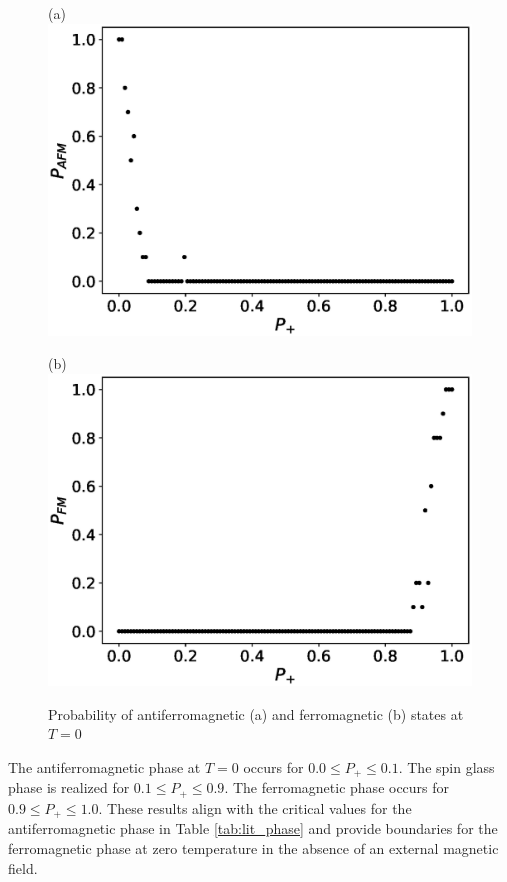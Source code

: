 \documentclass[utf8, babel, sor, jor, amsmath, amssymb, reprint]{elsarticle} %
\begin{document}
\begin{figure}[H]
	\begin{minipage}[h]{0.45\linewidth}
		\centering (a)
		\includegraphics[width=1\linewidth]{images/P_AFM_Mmax.eps}
	\end{minipage}
	\hfill
	\begin{minipage}[h]{0.45\linewidth}
		\centering (b)
		\includegraphics[width=1\linewidth]{images/P_FM_Mmax.eps}
	\end{minipage}
	\caption{Probability of antiferromagnetic (a) and ferromagnetic (b) states at \( T = 0 \)}
	\label{fig:P_AFM_FM_Mmax}
\end{figure}

The antiferromagnetic phase at $T = 0$ occurs for $0.0 \leq P_+ \leq 0.1$. The spin glass phase is realized for $0.1 \leq P_+ \leq 0.9$. The ferromagnetic phase occurs for $0.9 \leq P_+ \leq 1.0$. These results align with the critical values for the antiferromagnetic phase in Table \ref{tab:lit_phase} and provide boundaries for the ferromagnetic phase at zero temperature in the absence of an external magnetic field.
\end{document}
